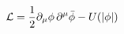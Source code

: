 \begin{equation}
{\cal L}=\frac{1}{2}\partial _{\mu }\phi \,\partial ^{\mu }\bar{\phi}%
-U(|\phi |)  \label{L}
\end{equation}%
